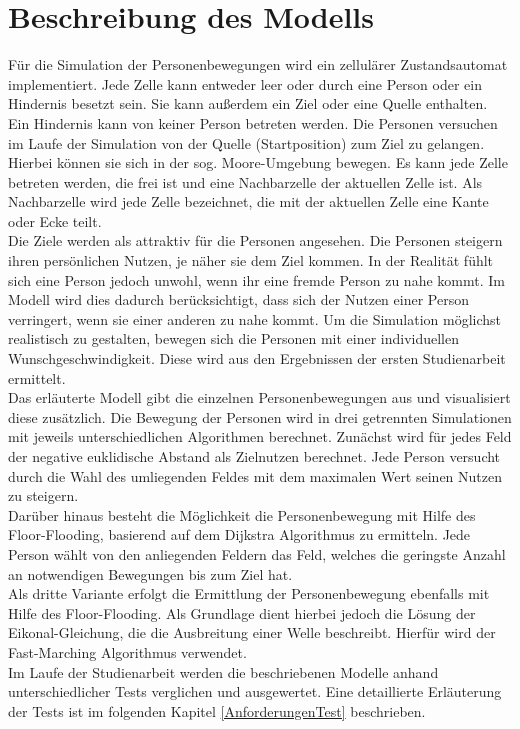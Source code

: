 \section{Beschreibung des Modells}
Für die Simulation der Personenbewegungen wird ein zellulärer Zustandsautomat implementiert. Jede Zelle kann entweder leer oder durch eine Person oder ein Hindernis besetzt sein. Sie kann außerdem ein Ziel oder eine Quelle enthalten. Ein Hindernis kann von keiner Person betreten werden. Die Personen versuchen im Laufe der Simulation von der Quelle (Startposition) zum Ziel zu gelangen. Hierbei können sie sich in der sog. Moore-Umgebung bewegen. Es kann jede Zelle betreten werden, die frei ist und eine Nachbarzelle der aktuellen Zelle ist. Als Nachbarzelle wird jede Zelle bezeichnet, die mit der aktuellen Zelle eine Kante oder Ecke teilt. \\
Die Ziele werden als attraktiv für die Personen angesehen. Die Personen steigern ihren persönlichen Nutzen, je näher sie dem Ziel kommen. In der Realität fühlt sich eine Person jedoch unwohl, wenn ihr eine fremde Person zu nahe kommt. Im Modell wird dies dadurch berücksichtigt, dass sich der Nutzen einer Person verringert, wenn sie einer anderen zu nahe kommt. Um die Simulation möglichst realistisch zu gestalten, bewegen sich die Personen mit einer individuellen Wunschgeschwindigkeit. Diese wird aus den Ergebnissen der ersten Studienarbeit ermittelt. \\
Das erläuterte Modell gibt die einzelnen Personenbewegungen aus und visualisiert diese zusätzlich. Die Bewegung der Personen wird in drei getrennten Simulationen mit jeweils unterschiedlichen Algorithmen berechnet. Zunächst wird für jedes Feld der negative euklidische Abstand als Zielnutzen berechnet. Jede Person versucht durch die Wahl des umliegenden Feldes mit dem maximalen Wert seinen Nutzen zu steigern. \\
Darüber hinaus besteht die Möglichkeit die Personenbewegung mit Hilfe des Floor-Flooding, basierend auf dem Dijkstra Algorithmus zu ermitteln. Jede Person wählt von den anliegenden Feldern das Feld, welches die geringste Anzahl an notwendigen Bewegungen bis zum Ziel hat. \\
Als dritte Variante erfolgt die Ermittlung der Personenbewegung ebenfalls mit Hilfe des Floor-Flooding. Als Grundlage dient hierbei jedoch die Lösung der Eikonal-Gleichung, die die Ausbreitung einer Welle beschreibt. Hierfür wird der Fast-Marching Algorithmus verwendet.  \\
Im Laufe der Studienarbeit werden die beschriebenen Modelle anhand unterschiedlicher Tests verglichen und ausgewertet. Eine detaillierte Erläuterung der Tests ist im folgenden Kapitel \ref{AnforderungenTest} beschrieben.

